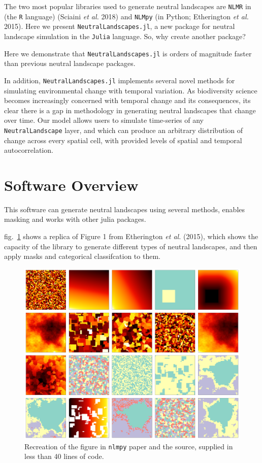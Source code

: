 \documentclass[11pt]{article}
\makeatletter
\def\maxwidth{\ifdim\Gin@nat@width>\linewidth\linewidth
\else\Gin@nat@width\fi}
\let\Oldincludegraphics\includegraphics
\renewcommand{\includegraphics}[1]{\Oldincludegraphics[width=\maxwidth]{#1}}
\makeatother
\begin{document}
The two most popular libraries used to generate neutral landscapes are
\texttt{NLMR} in (the \texttt{R} language) (Sciaini \emph{et al.} 2018)
and \texttt{NLMpy} (in Python; Etherington \emph{et al.} 2015). Here we
present \texttt{NeutralLandscapes.jl}, a new package for neutral
landscape simulation in the \texttt{Julia} language. So, why create
another package?

Here we demonstrate that \texttt{NeutralLandscapes.jl} is orders of
magnitude faster than previous neutral landscape packages.

In addition, \texttt{NeutralLandscapes.jl} implements several novel
methods for simulating environmental change with temporal variation. As
biodiversity science becomes increasingly concerned with temporal change
and its consequences, its clear there is a gap in methodology in
generating neutral landscapes that change over time. Our model allows
users to simulate time-series of any \texttt{NeutralLandscape} layer,
and which can produce an arbitrary distribution of change across every
spatial cell, with provided levels of spatial and temporal
autocorrelation.

\hypertarget{software-overview}{%
\section{Software Overview}\label{software-overview}}

This software can generate neutral landscapes using several methods,
enables masking and works with other julia packages.

fig.~\ref{fig:allmethods} shows a replica of Figure 1 from Etherington
\emph{et al.} (2015), which shows the capacity of the library to
generate different types of neutral landscapes, and then apply masks and
categorical classifcation to them.

\begin{figure}
\hypertarget{fig:allmethods}{%
\centering
\includegraphics{./figures/figure1.png}
\caption{Recreation of the figure in \texttt{nlmpy} paper and the
source, supplied in less than 40 lines of code.}\label{fig:allmethods}
}
\end{figure}
\end{document}
